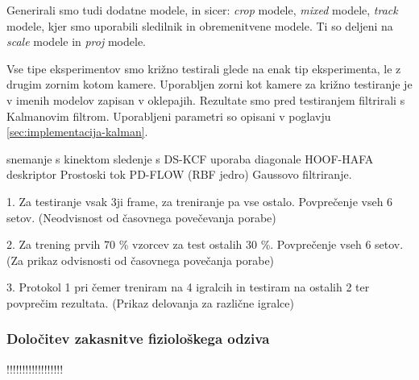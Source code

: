 Generirali smo tudi dodatne modele, in sicer: \textit{crop} modele, \textit{mixed} modele, \textit{track} modele, kjer smo uporabili sledilnik in obremenitvene modele. Ti so deljeni na \textit{scale} modele in \textit{proj} modele.

Vse tipe eksperimentov smo križno testirali glede na enak tip eksperimenta, le z drugim zornim kotom kamere. Uporabljen zorni kot kamere za križno testiranje je v imenih modelov zapisan v oklepajih. Rezultate smo pred testiranjem filtrirali s Kalmanovim filtrom. Uporabljeni parametri so opisani v poglavju \ref{sec:implementacija-kalman}.






snemanje s kinektom sledenje s DS-KCF uporaba diagonale   HOOF-HAFA deskriptor Prostoski tok PD-FLOW  \nurbf (\nusvr RBF jedro) Gaussovo filtriranje.

1. Za testiranje vsak 3ji frame, za treniranje pa vse ostalo. Povprečenje vseh 6 setov. (Neodvisnost od časovnega povečevanja porabe) 

2. Za trening prvih 70 \% vzorcev za test ostalih 30 \%. Povprečenje vseh 6 setov. (Za prikaz odvisnosti od časovnega povečanja porabe) 

3. Protokol 1 pri čemer treniram na 4 igralcih in testiram na ostalih 2 ter povprečim rezultata. (Prikaz delovanja za različne igralce)

\subsubsection{Določitev zakasnitve fiziološkega odziva}
!!!!!!!!!!!!!!!!!!

